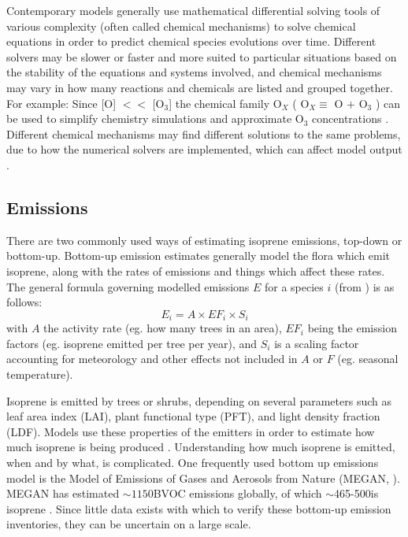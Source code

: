     Contemporary models generally use mathematical differential solving tools of various complexity (often called chemical mechanisms) to solve chemical equations in order to predict chemical species evolutions over time.
    Different solvers may be slower or faster and more suited to particular situations based on the stability of the equations and systems involved, and chemical mechanisms may vary in how many reactions and chemicals are listed and grouped together.
    For example: Since [O] $<<$ [O$_3$] the chemical family O$_X$ (  O$_X \equiv $ O $+$ O$_3$ ) can be used to simplify chemistry simulations and approximate O$_3$ concentrations \parencite[][Chapter 3]{BrasseurJacob2017}.
    Different chemical mechanisms may find different solutions to the same problems, due to how the numerical solvers are implemented, which can affect model output \parencite{Zhang2012}.
    
  
  \subsection{Emissions}
  
    There are two commonly used ways of estimating isoprene emissions, top-down or bottom-up.
    Bottom-up emission estimates generally model the flora which emit isoprene, along with the rates of emissions and things which affect these rates.
    The general formula governing modelled emissions $E$ for a species $i$ (from \textcite{BrasseurJacob2017}) is as follows:
    \begin{equation*}
      E_i = A \times EF_i \times S_i
    \end{equation*}
    with $A$ the activity rate (eg. how many trees in an area), $EF_i$ being the emission factors (eg. isoprene emitted per tree per year), and $S_i$ is a scaling factor accounting for meteorology and other effects not included in $A$ or $F$ (eg. seasonal temperature).
    
    
    Isoprene is emitted by trees or shrubs, depending on several parameters such as leaf area index (LAI), plant functional type (PFT), and light density fraction (LDF).
    Models use these properties of the emitters in order to estimate how much isoprene is being produced \parencite[eg.][]{Guenther1995,Guenther2006}.
    Understanding how much isoprene is emitted, when and by what, is complicated.
    One frequently used bottom up emissions model is the Model of Emissions of Gases and Aerosols from Nature (MEGAN, \textcite{Guenther1995}).
    MEGAN has estimated $\sim 1150$\tgcpyr BVOC emissions globally, of which $\sim$465-500\tgcpyr is isoprene \parencite{Guenther2006, Messina2016}. 
    Since little data exists with which to verify these bottom-up emission inventories, they can be uncertain on a large scale.
    
